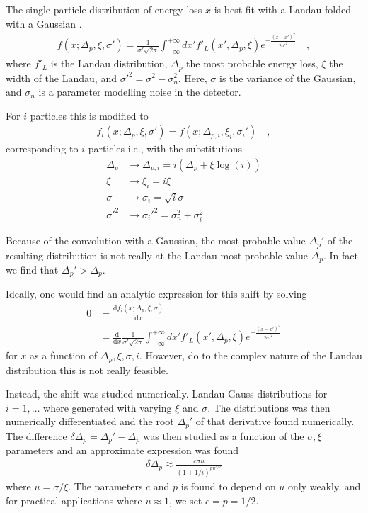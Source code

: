 \documentclass[compat,11pt]{alicenote}
\newcommand\FIXME[1]{\marginpar{\raggedright\textbf{FIXME:} #1}}
\begin{document}
\FIXME{Example plots}
The single particle distribution of energy loss $x$ is best fit with a
Landau folded with a Gaussian \cite{nim:b1:16,phyrev:a28:615}.
\begin{align} 
  \label{eq:f}
 f(x;\Delta_p,\xi,\sigma') = \frac{1}{\sigma' \sqrt{2 \pi}}
 \int_{-\infty}^{+\infty} dx' f'_{L}(x',\Delta_p,\xi)
 e^{-\frac{(x-x')^2}{2\sigma'^2}}\quad,
\end{align}
where $ f'_{L}$ is the Landau distribution, $\Delta_p$ the most
probable energy loss, $ \xi$ the width of the Landau, and $
\sigma'^2=\sigma^2-\sigma_n^2 $.  Here, $\sigma$ is the variance of
the Gaussian, and $\sigma_n$ is a parameter modelling noise in the
detector.

For $i$ particles this is modified to 
\begin{align}
  f_i(x;\Delta_{p},\xi,\sigma')=f(x;\Delta_{p,i},\xi_i,\sigma_i')\quad,
\end{align}
corresponding to $ i$ particles i.e., with the substitutions 
\begin{align*}
  \Delta_p  &\rightarrow \Delta_{p,i} = i\left(\Delta_p + \xi\log(i)\right)\\
  \xi       &\rightarrow \xi_i       = i \xi\\
  \sigma    &\rightarrow \sigma_i    = \sqrt{i}\sigma\\
  \sigma'^2 &\rightarrow \sigma_i'^2 = \sigma_n^2 + \sigma_i^2
\end{align*}

Because of the convolution with a Gaussian, the most-probable-value
$\Delta_p'$ of the resulting distribution is not really at the
Landau most-probable-value $\Delta_p$.  In fact we find that
$\Delta_p' > \Delta_p$.

Ideally, one would find an analytic expression for this shift by
solving
\begin{align*}
  0 &= \frac{\text{d} f_i(x;\Delta_p,\xi,\sigma)}{\text{d}x}\nonumber\\
    &= \frac{\text{d}}{\text{d}x}\frac{1}{\sigma' \sqrt{2 \pi}}
     \int_{-\infty}^{+\infty} dx' f'_{L}(x',\Delta_p,\xi)
     e^{-\frac{(x-x')^2}{2\sigma'^2}}
\end{align*}
for $x$ as a function of $\Delta_p,\xi,\sigma,i$. However,
do to the complex nature of the Landau distribution this is not
really feasible.

Instead, the shift was studied numerically. Landau-Gauss
distributions for $i=1,\ldots$ where generated with varying
$\xi$ and $\sigma$.  The distributions was then numerically
differentiated and the root $\Delta_p'$ of that derivative
found numerically.  The difference
$\delta\Delta_p=\Delta_p'-\Delta_p$ was then studied as a
function of the $\sigma,\xi$ parameters and an approximate
expression was found
\begin{align}
  \delta\Delta_p \approx \frac{c \sigma u}{(1+1/i)^{p u^{3/2}}}
\end{align}
where $ u=\sigma/\xi$.  The parameters $c$ and $p$ is
found to depend on $ u$ only weakly, and for practical
applications where $u\approx1$, we set $ c=p=1/2$. 
\end{document}

